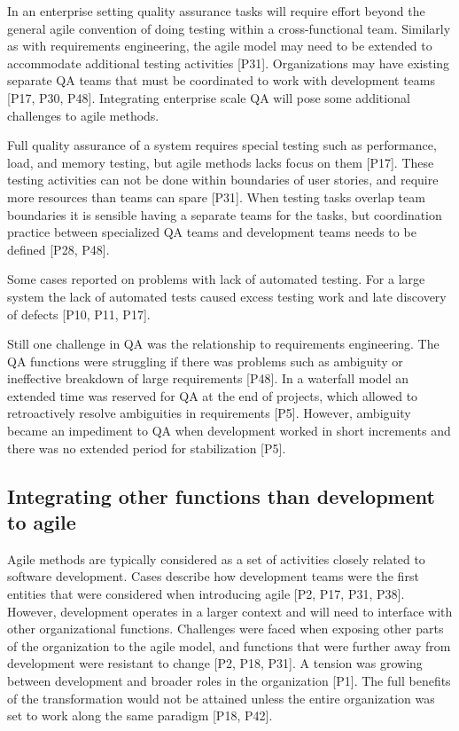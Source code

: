 In an enterprise setting quality assurance tasks will require effort beyond the
general agile convention of doing testing within a cross-functional team.
Similarly as with requirements engineering, the agile model may need to be
extended to accommodate additional testing activities [P31]. Organizations may
have existing separate QA teams that must be coordinated to work with
development teams [P17, P30, P48]. Integrating enterprise scale QA will pose
some additional challenges to agile methods.

Full quality assurance of a system requires special testing such as performance,
load, and memory testing, but agile methods lacks focus on them [P17]. These
testing activities can not be done within boundaries of user stories, and
require more resources than teams can spare [P31]. When testing tasks overlap
team boundaries it is sensible having a separate teams for the tasks, but
coordination practice between specialized QA teams and development teams needs
to be defined [P28, P48].

Some cases reported on problems with lack of automated testing. For a large
system the lack of automated tests caused excess testing work and late discovery
of defects [P10, P11, P17].

Still one challenge in QA was the relationship to requirements engineering. The
QA functions were struggling if there was problems such as ambiguity or
ineffective breakdown of large requirements [P48]. In a waterfall model an
extended time was reserved for QA at the end of projects, which allowed to
retroactively resolve ambiguities in requirements [P5]. However, ambiguity
became an impediment to QA when development worked in short increments and
there was no extended period for stabilization [P5].


\subsection{Integrating other functions than development to agile}
\label{section_other_functions}

Agile methods are typically considered as a set of activities closely related to
software development. Cases describe how development teams were the first
entities that were considered when introducing agile [P2, P17, P31, P38].
However, development operates in a larger context and will need to interface
with other organizational functions.
Challenges were faced when exposing other parts of the organization to the agile
model, and functions that were further away from development were resistant to
change [P2, P18, P31]. A tension was growing between development and broader
roles in the organization [P1]. The full benefits of the transformation would
not be attained unless the entire organization was set to work along the same
paradigm [P18, P42].

